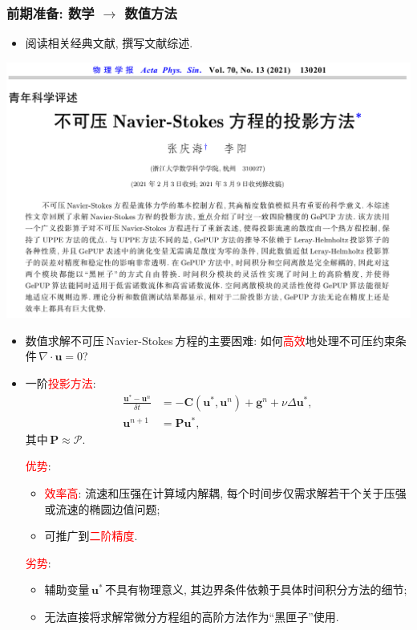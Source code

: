 \documentclass{beamer}
\begin{document}
\begin{CJK*}{UTF8}{gkai}
  \begin{frame}
    \frametitle{前期准备: 数学 $\rightarrow$ 数值方法}
    \begin{itemize}
    \item
      阅读相关经典文献, 撰写文献综述.
    \end{itemize}
    \begin{center}
      \includegraphics[scale=0.22]{./png/methods}
    \end{center}
  \end{frame}

  \begin{frame}
    \begin{itemize}
    \item
      数值求解不可压\,Navier-Stokes\,方程的主要困难:
      如何\textcolor{red}{高效}地处理不可压约束条件\,$\nabla\cdot \bm{u}=0$?
    \item
      一阶\textcolor{red}{投影方法}:
      \begin{align*}
        \frac{\bm{u}^{*}-\bm{u}^n}{\delta t} &= -\bm{C}\left( \bm{u}^{*}, \bm{u}^n \right) + \bm{g}^n+\nu \Delta \bm{u}^{*}, \\
        \bm{u}^{n+1} &= \bm{P}\bm{u}^{*},
      \end{align*}
      其中\,$\bm{P}\approx \mathscr{P}$.

      \textcolor{red}{优势}:
      \begin{itemize}
      \item \textcolor{red}{效率高}:
        流速和压强在计算域内解耦,
        每个时间步仅需求解若干个关于压强或流速的椭圆边值问题;
      \item
        可推广到\textcolor{red}{二阶精度}.
      \end{itemize}
      \textcolor{red}{劣势}:
      \begin{itemize}
      \item
        辅助变量\,$\bm{u}^{*}$\,不具有物理意义,
        其边界条件依赖于具体时间积分方法的细节;
      \item
        无法直接将求解常微分方程组的高阶方法作为``黑匣子''使用.
      \end{itemize}
    \end{itemize}
  \end{frame}


\end{CJK*}
\end{document}
